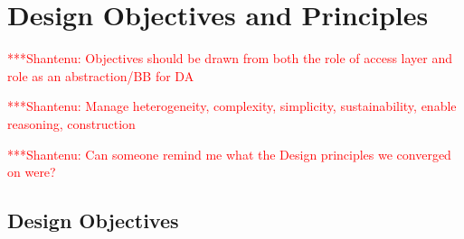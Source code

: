 \documentclass[a4paper,10pt]{article}
\newcommand{\jhanote}[1]{  {\textcolor{red}  { ***Shantenu: #1 }}}
\newcommand{\jhanote}[1]{}
\begin{document}
\section{Design Objectives and Principles}\label{saga_impls}


 \jhanote{Objectives should be drawn from both the role of access
   layer and role as an abstraction/BB for DA}

 \jhanote{Manage heterogeneity, complexity, simplicity,
   sustainability, enable reasoning, construction}

 \jhanote{Can someone remind me what the Design principles we
   converged on were?}

 \subsection{Design Objectives}

\end{document}
